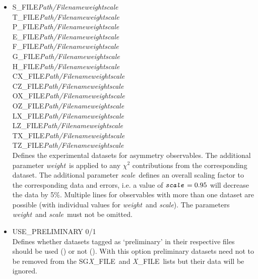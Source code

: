 \documentclass[a4paper,10pt]{article}
\def\bl{\phantom{0}}
\def\tt{\ttfamily}
\def\rm{\rmfamily}
\begin{document}
\begin{itemize}
\item
\tt S\_FILE\bl\bl \textit{Path/Filename}\bl \textit{weight}\bl \textit{scale}\rm\\
\tt T\_FILE\bl\bl \textit{Path/Filename}\bl \textit{weight}\bl \textit{scale}\rm\\
\tt P\_FILE\bl\bl \textit{Path/Filename}\bl \textit{weight}\bl \textit{scale}\rm\\
\tt E\_FILE\bl\bl \textit{Path/Filename}\bl \textit{weight}\bl \textit{scale}\rm\\
\tt F\_FILE\bl\bl \textit{Path/Filename}\bl \textit{weight}\bl \textit{scale}\rm\\
\tt G\_FILE\bl\bl \textit{Path/Filename}\bl \textit{weight}\bl \textit{scale}\rm\\
\tt H\_FILE\bl\bl \textit{Path/Filename}\bl \textit{weight}\bl \textit{scale}\rm\\
\tt CX\_FILE\bl   \textit{Path/Filename}\bl \textit{weight}\bl \textit{scale}\rm\\
\tt CZ\_FILE\bl   \textit{Path/Filename}\bl \textit{weight}\bl \textit{scale}\rm\\
\tt OX\_FILE\bl   \textit{Path/Filename}\bl \textit{weight}\bl \textit{scale}\rm\\
\tt OZ\_FILE\bl   \textit{Path/Filename}\bl \textit{weight}\bl \textit{scale}\rm\\
\tt LX\_FILE\bl   \textit{Path/Filename}\bl \textit{weight}\bl \textit{scale}\rm\\
\tt LZ\_FILE\bl   \textit{Path/Filename}\bl \textit{weight}\bl \textit{scale}\rm\\
\tt TX\_FILE\bl   \textit{Path/Filename}\bl \textit{weight}\bl \textit{scale}\rm\\
\tt TZ\_FILE\bl   \textit{Path/Filename}\bl \textit{weight}\bl \textit{scale}\rm\\
Defines the experimental datasets for asymmetry observables. The additional
parameter \tt\textit{weight}\rm\ is applied to any $\chi^2$ contributions from the corresponding dataset. The additional
parameter \tt\textit{scale}\rm\ defines an overall scaling factor to the corresponding data and errors, i.e.
a value of $\mbox{\tt\textit{scale}\rm} = 0.95$ will decrease the data by 5\%.
Multiple lines for observables with more than one dataset are possible (with individual values for
\tt\textit{weight}\rm\ and \tt\textit{scale}\rm).
The parameters \tt\textit{weight}\rm\ and \tt\textit{scale}\rm\ must not be omitted.

\item
\tt USE\_PRELIMINARY 0/1\rm\\
Defines whether datasets tagged as `preliminary' in their respective files should be used (\tt1\rm) or not (\tt0\rm).
With this option preliminary datasets need not to be removed from the 
\tt SG\textit{X}\_FILE\rm\ and \tt \textit{X}\_FILE\rm\ lists but their data will be ignored.
\end{itemize}
\end{document}
